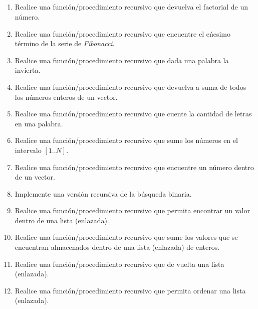 \documentclass[a4paper,10pt]{article}
\begin{document}
~\\ \\ \\ \\

\begin{enumerate}

\item Realice una funci\'on/procedimiento recursivo que devuelva el factorial de un n\'umero.

\item Realice una funci\'on/procedimiento recursivo que encuentre el e\'nesimo t\'ermino de la serie de \emph{Fibonacci}.

\item Realice una funci\'on/procedimiento recursivo que dada una palabra la invierta.

\item Realice una funci\'on/procedimiento recursivo que devuelva a suma de todos los n\'umeros enteros de un vector.

\item Realice una funci\'on/procedimiento recursivo que cuente la cantidad de letras en una palabra.

\item Realice una funci\'on/procedimiento recursivo que sume los n\'umeros en el intervalo $[1..N]$.

\item Realice una funci\'on/procedimiento recursivo que encuentre un n\'umero dentro de un vector.

\item Implemente una versi\'on recursiva de la b\'usqueda binaria.

\item Realice una funci\'on/procedimiento recursivo que permita encontrar un valor dentro de una lista (enlazada).

\item Realice una funci\'on/procedimiento recursivo que sume los valores que se encuentran almacenados dentro de una lista (enlazada) de enteros.
    
\item Realice una funci\'on/procedimiento recursivo que de vuelta una lista (enlazada).

\item Realice una funci\'on/procedimiento recursivo que permita ordenar una lista (enlazada).


\end{enumerate}
\end{document}
